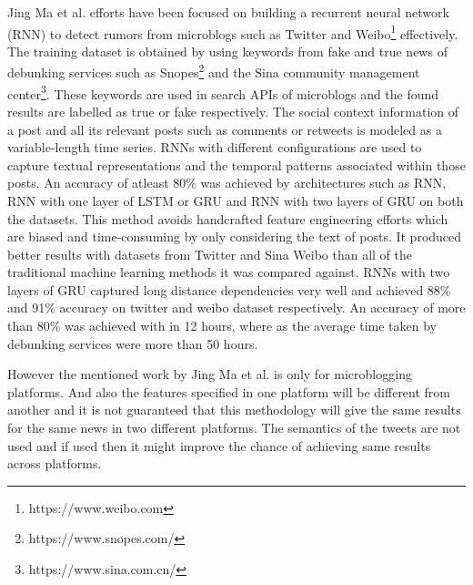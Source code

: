 \documentclass[a4paper, 11pt]{article}
\begin{document}
Jing Ma et al.\cite{Ma} efforts have been focused on building a recurrent neural network (RNN) to detect rumors from microblogs such as Twitter and Weibo\footnote{https://www.weibo.com} effectively. The training dataset is obtained by using keywords from fake and true news of debunking services such as Snopes\footnote{https://www.snopes.com/} and the Sina community management center\footnote{https://www.sina.com.cn/}. These keywords are used in search APIs of microblogs and the found results are labelled as true or fake respectively. The social context information of a post and all its relevant posts such as comments or retweets is modeled as a variable-length time series. RNNs with different configurations are used to capture textual representations and the temporal patterns associated within those posts. An accuracy of atleast 80\% was achieved by architectures such as RNN, RNN with one layer of LSTM or GRU and RNN with two layers of GRU on both the datasets. This method avoids handcrafted feature engineering efforts which are biased and time-consuming by only considering the text of posts. It produced better results with datasets from Twitter and Sina Weibo than all of the traditional machine learning methods it was compared against. RNNs with two layers of GRU captured long distance dependencies very well and achieved 88\% and 91\% accuracy on twitter and weibo dataset respectively. An accuracy of more than 80\% was achieved with in 12 hours, where as the average time taken by debunking services were more than 50 hours.

However the mentioned work by Jing Ma et al. is only for microblogging platforms. And also the features specified in one platform will be different from another and it is not guaranteed that this methodology will give the same results for the same news in two different platforms. The semantics of the tweets are not used and if used then it might improve the chance of achieving same results across platforms.
\end{document}
